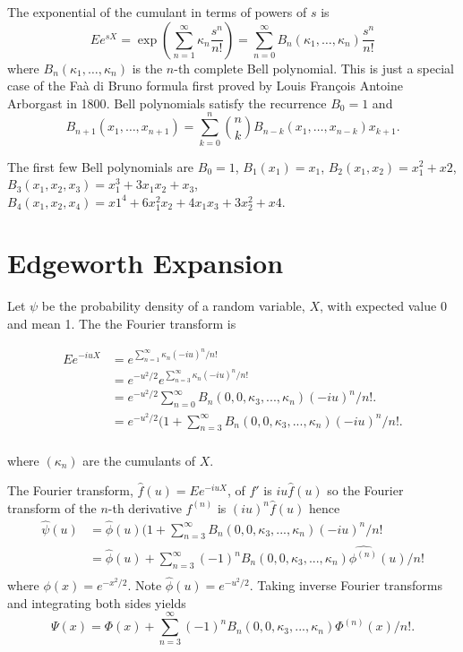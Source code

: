 \documentclass[12pt]{article}
\theoremstyle{definition}
\begin{document}
The exponential of the cumulant in terms of
powers of \(s\) is
\[
Ee^{sX} =  \exp(\sum_{n=1}^\infty \kappa_n \frac{s^n}{n!})
= \sum_{n=0}^\infty B_n(\kappa_1,\dots,\kappa_n) \frac{s^n}{n!}
\]
where \(B_n(\kappa_1,\dots,\kappa_n)\) is the \(n\)-th complete
Bell polynomial.
This is just a special case of the
Fa\`a di Bruno formula first proved by Louis Fran\c{c}ois Antoine
Arborgast in 1800\cite{Arb1800}.
Bell polynomials satisfy the recurrence \cite{Com1974} \(B_0 = 1\) and
\[
B_{n+1}(x_1,\dots,x_{n+1}) = \sum_{k=0}^n \binom{n}{k}
B_{n - k}(x_1,\dots, x_{n - k}) x_{k+1}.
\]

The first few Bell polynomials are $B_0 = 1$, $B_1(x_1) = x_1$,
$B_2(x_1, x_2) = x_1^2 + x2$,
$B_3(x_1, x_2, x_3) =
x_1^3 + 3x_1x_2 + x_3$,
$B_4(x_1, x_2, x_4) =
x1^4 + 6 x_1^2 x_2 + 4 x_1 x_3 + 3 x_2^2  + x4$.

\section{Edgeworth Expansion}
Let $\psi$ be the probability density of a random variable, $X$,
with expected value 0 and mean 1.
The the Fourier transform is

\begin{align*}
E e^{-iuX} &= e^{\sum_{n=1}^\infty \kappa_n (-iu)^n/n!}\\
           &= e^{-u^2/2} e^{\sum_{n=3}^\infty \kappa_n (-iu)^n/n!}\\
           &= e^{-u^2/2} \sum_{n=0}^\infty B_n(0, 0, \kappa_3,...,\kappa_n)(-iu)^n/n!.\\
	   &= e^{-u^2/2} (1 + \sum_{n=3}^\infty B_n(0, 0, \kappa_3,...,\kappa_n)(-iu)^n/n!.\\
\end{align*}

where \((\kappa_n)\) are the cumulants of \(X\).

The Fourier transform, \(\hat{f}(u) = Ee^{-iuX}\),
of \(f'\) is \(iu \hat f(u)\) so
the Fourier transform of the \(n\)-th derivative
\(f^{(n)}\) is \((iu)^n\hat f(u)\) hence
\begin{align*}
\hat{\psi}(u) &= \hat{\phi}(u)(1 + \sum_{n=3}^\infty B_n(0, 0,\kappa_3,...,\kappa_n) (-iu)^n/n!\\
	&= \hat{\phi}(u) + \sum_{n=3}^\infty (-1)^n B_n(0, 0, \kappa_3,...,\kappa_n)
	\widehat{\phi^{(n)}}(u)/n!\\
\end{align*}
where \(\phi(x) = e^{-x^2/2}\). Note \(\hat{\phi}(u) = e^{-u^2/2}\).
Taking inverse Fourier transforms and integrating both
sides yields
\begin{equation}
	\Psi(x) = \Phi(x) + \sum_{n=3}^\infty (-1)^n B_n(0,0,\kappa_3,...,\kappa_n) \Phi^{(n)}(x)/n!.
\end{equation}
\end{document}
